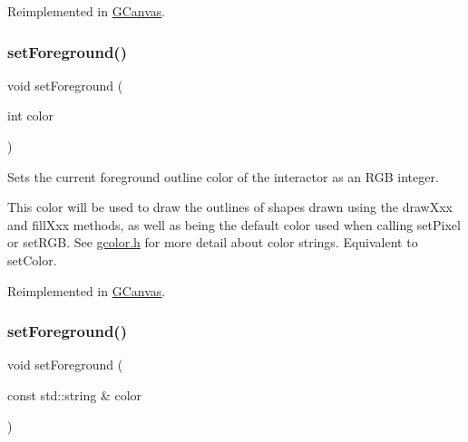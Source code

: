 Reimplemented in \mbox{\hyperlink{classGCanvas_ab39ef411fb13a52852ddd138c5932e2e}{G\+Canvas}}.

\mbox{\label{classGDrawingSurface_a7daa57084b5811b598fce8726660b328}} 
\subsubsection{\texorpdfstring{set\+Foreground()}{setForeground()}\hspace{0.1cm}{\footnotesize\ttfamily [1/2]}}
{\footnotesize\ttfamily void set\+Foreground (\begin{DoxyParamCaption}\item[{int}]{color }\end{DoxyParamCaption})\hspace{0.3cm}{\ttfamily [virtual]}}



Sets the current foreground outline color of the interactor as an R\+GB integer. 

This color will be used to draw the outlines of shapes drawn using the draw\+Xxx and fill\+Xxx methods, as well as being the default color used when calling set\+Pixel or set\+R\+GB. See \mbox{\hyperlink{gcolor_8h_source}{gcolor.\+h}} for more detail about color strings. Equivalent to set\+Color. 

Reimplemented in \mbox{\hyperlink{classGCanvas_af9227e80cbfac55ce936fa5c99ffc954}{G\+Canvas}}.

\mbox{\label{classGDrawingSurface_af59209aeadea6dfc6d97a2d8531f50e1}} 
\subsubsection{\texorpdfstring{set\+Foreground()}{setForeground()}\hspace{0.1cm}{\footnotesize\ttfamily [2/2]}}
{\footnotesize\ttfamily void set\+Foreground (\begin{DoxyParamCaption}\item[{const std\+::string \&}]{color }\end{DoxyParamCaption})\hspace{0.3cm}{\ttfamily [virtual]}}



